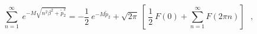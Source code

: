 \begin{equation}
\sum _{n=1}^{\infty}~e^{-M\sqrt {n^2\beta^2 + \tilde p_{2}^{2} }} =
-\frac{1}{2}~e^{-M\tilde p_2} + \sqrt {2\pi}~[~\frac {1}{2}~F(0) + 
\sum _{n=1}^{\infty} F(2\pi n)] ~~~,
\end{equation}

